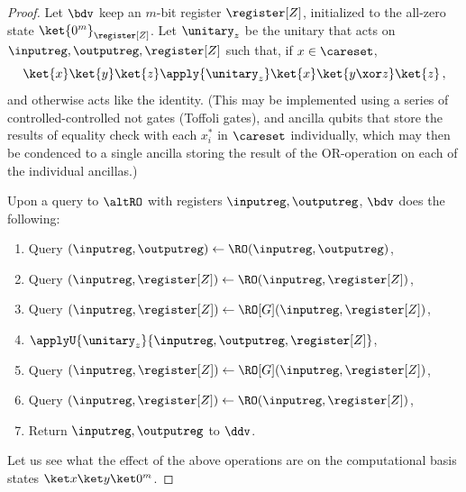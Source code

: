     \begin{proof}
      Let $\bdv$ keep an $m$-bit register $\register[Z]$, initialized to the
      all-zero state $\ket{0^m}_{\register[Z]}$. Let $\unitary_z$ be the
      unitary that acts on $\inputreg, \outputreg, \register[Z]$ such
      that, if $x \in \careset$, 
      \[ 
        \ket{x}\ket{y}\ket{z} \apply{\unitary_z} \ket{x}\ket{y \xor z}\ket{z}\, ,
      \]
      and otherwise acts like the identity.
      (This may be implemented using a series of controlled-controlled not gates
      (Toffoli gates), and ancilla qubits that store the results of equality
      check with each $x^*_i$ in $\careset$ individually, which may then be
      condenced to a single ancilla storing the result of the OR-operation on
      each of the individual ancillas.)

      Upon a query to $\altRO$ with
      registers $\inputreg, \outputreg$, $\bdv$ does the following:
      \begin{enumerate}
        \item Query $(\inputreg,\outputreg) \gets \RO(\inputreg, \outputreg)$,
        \item Query $(\inputreg,\register[Z]) \gets \RO(\inputreg, \register[Z])$,
        \item Query $(\inputreg,\register[Z]) \gets \RO[G](\inputreg, \register[Z])$, 
        \item $\applyU{\unitary_z}{\inputreg, \outputreg, \register[Z]}$,
        \item Query $(\inputreg,\register[Z]) \gets \RO[G](\inputreg, \register[Z])$,
        \item Query $(\inputreg,\register[Z]) \gets \RO(\inputreg, \register[Z])$,
        \item Return ${\inputreg, \outputreg}$ to $\ddv$.
      \end{enumerate}
      
      \noindent
      Let us see what the effect of the above operations are on the
        computational basis states $\ket x \ket y \ket 0^m$.


\end{proof}
